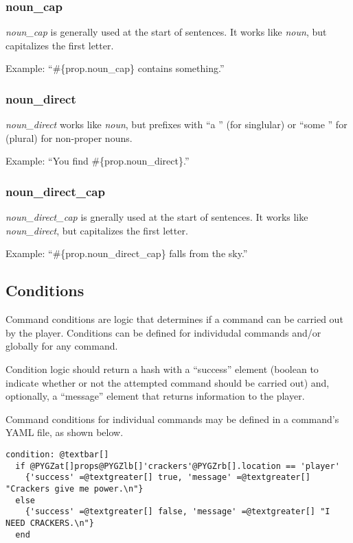 \documentclass[letterpaper,10pt,english]{sphinxmanual}
\begin{document}
\subsubsection{noun\_cap}
\label{manipulation:noun-cap}
\emph{noun\_cap} is generally used at the start of sentences. It works like \emph{noun}, but capitalizes the first letter.

Example: ``\#\{prop.noun\_cap\} contains something.''


\subsubsection{noun\_direct}
\label{manipulation:noun-direct}
\emph{noun\_direct} works like \emph{noun}, but prefixes with ``a '' (for singlular) or ``some '' for (plural) for non-proper nouns.

Example: ``You find \#\{prop.noun\_direct\}.''


\subsubsection{noun\_direct\_cap}
\label{manipulation:noun-direct-cap}
\emph{noun\_direct\_cap} is gnerally used at the start of sentences. It works like \emph{noun\_direct}, but capitalizes the first letter.

Example: ``\#\{prop.noun\_direct\_cap\} falls from the sky.''


\subsection{Conditions}
\label{manipulation:conditions}
Command conditions are logic that determines if a command can be carried out by the player. Conditions can be defined for individudal commands and/or globally for any command.

Condition logic should return a hash with a ``success'' element (boolean to indicate whether or not the attempted command should be carried out) and, optionally, a ``message'' element that returns information to the player.

Command conditions for individual commands may be defined in a command's YAML file, as shown below.

\begin{Verbatim}[commandchars=@\[\]]
condition: @textbar[]
  if @PYGZat[]props@PYGZlb[]'crackers'@PYGZrb[].location == 'player'
    {'success' =@textgreater[] true, 'message' =@textgreater[] "Crackers give me power.\n"}
  else
    {'success' =@textgreater[] false, 'message' =@textgreater[] "I NEED CRACKERS.\n"}
  end
\end{Verbatim}
\end{document}
